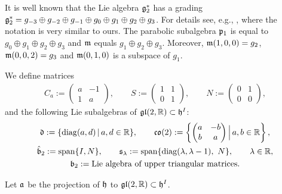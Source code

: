 \documentclass[pdftex]{sigma}
\numberwithin{equation}{section}
\newcommand\fg{{\frak{g}}}
\newcommand\fh{{\frak h}}
\newcommand\fm{{\frak m}}
\newcommand\fp{{\frak p}}
\newcommand\fa{{\frak a}}
\newcommand\fb{{\frak b}}
\newcommand\fd{{\frak d}}
\newcommand\fs{{\frak s}}
\newcommand{\fgl}{\mathop{{\frak g \frak l}}}
\newcommand{\fco}{\mathop{{\frak c \frak o}}}
\newcommand\RR{{\mathbb R}}
\newcommand{\Span}{\operatorname{span}}
\newcommand{\diag}{\operatorname{diag}}
\begin{document}
\begin{Remark}
It is well known that the Lie algebra $\fg_2^*$ has a grading $\fg_2^*=g_{-3}\oplus g_{-2}\oplus g_{-1}\oplus g_0 \oplus g_{1}\oplus g_2\oplus g_3$. For details see, e.g., \cite[p.~14]{HS}, where the notation is very similar to ours. The parabolic subalgebra $\fp_1$ is equal to $g_0 \oplus g_{1}\oplus g_2\oplus g_3$ and $\fm$ equals $g_{1}\oplus g_2\oplus g_3$. Moreover, $\fm(1,0,0)=g_2$, $\fm(0,0,2)=g_3$ and $\fm(0,1,0)$ is a subspace of $g_1$.
\end{Remark}

We define matrices
\begin{gather*}C_a:=\left(\begin{matrix} a&-1\\1&a\end{matrix}\right),\qquad S:=\left(\begin{matrix} 1&1\\0&1\end{matrix}\right),\qquad N:=\left(\begin{matrix} 0&1\\0&0\end{matrix}\right),
\end{gather*}
and the following Lie subalgebras of $\fgl(2,\RR)\subset \fh^I$:
\begin{gather*}
\fd := \{\diag(a,d)\,|\, a,d\in\RR\},\qquad
\fco(2) := \left\{ \left(\begin{matrix} a&-b\\b&a\end{matrix}\right) \Big| \, a,b\in\RR\right\},\\
\hat\fb_2 := \Span\{ I,N\},\qquad
\fs_\lambda := \Span \{\diag(\lambda, \lambda-1),\ N\},\qquad \lambda\in\RR,\\
\fb_2 := \text{Lie algebra of upper triangular matrices}.
\end{gather*}

Let $\fa$ be the projection of $\fh$ to $\fgl(2,\RR)\subset \fh^I$.
\end{document}
